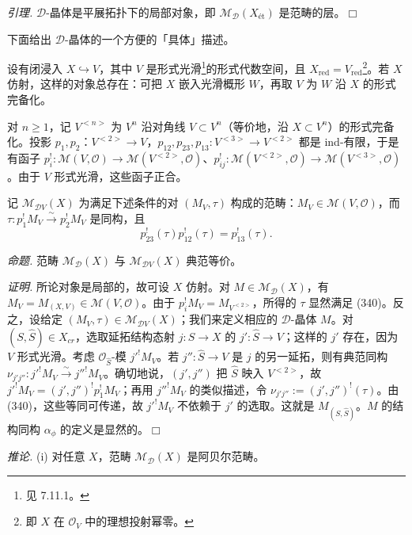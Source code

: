  \emph{引理.} $\mathcal{D}$-晶体是平展拓扑下的局部对象，即 $\mathcal{M}_{\mathcal{D}}(X_{\text{ét}})$ 是范畴的层。\hfill$\Box$

 下面给出 $\mathcal{D}$-晶体的一个方便的「具体」描述。

设有闭浸入 $X\hookrightarrow V$，其中 $V$ 是形式光滑\footnote{见 7.11.1。}的形式代数空间，且 $X_{\mathrm{red}}=V_{\mathrm{red}}$\footnote{即 $X$ 在 $\mathcal{O}_{V}$ 中的理想投射幂零。}。若 $X$ 仿射，这样的对象总存在：可把 $X$ 嵌入光滑概形 $W$，再取 $V$ 为 $W$ 沿 $X$ 的形式完备化。

对 $n\geq1$，记 $V^{<n>}$ 为 $V^{n}$ 沿对角线 $V\subset V^{n}$（等价地，沿 $X\subset V^{n}$）的形式完备化。投影 $p_{1},p_{2}$：$V^{<2>}\to V$，$p_{12},p_{23},p_{13}:V^{<3>}\to V^{<2>}$ 都是 ind-有限，于是有函子 $p^{!}_{i}:\mathcal{M}(V,\mathcal{O})\to\mathcal{M}(V^{<2>},\mathcal{O})$、$p^{!}_{ij}:\mathcal{M}(V^{<2>},\mathcal{O})\to\mathcal{M}(V^{<3>},\mathcal{O})$。由于 $V$ 形式光滑，这些函子正合。

记 $\mathcal{M}_{\mathcal{D}V}(X)$ 为满足下述条件的对 $(M_{V},\tau)$ 构成的范畴：$M_{V}\in\mathcal{M}(V,\mathcal{O})$，而 $\tau:p^{!}_{1}M_{V}\xrightarrow{\sim}p^{!}_{2}M_{V}$ 是同构，且
\begin{equation}\tag{340}
p^{!}_{23}(\tau)p^{!}_{12}(\tau)=p^{!}_{13}(\tau).
\end{equation}

 \emph{命题.} 范畴 $\mathcal{M}_{\mathcal{D}}(X)$ 与 $\mathcal{M}_{\mathcal{D}V}(X)$ 典范等价。

\emph{证明.} 所论对象是局部的，故可设 $X$ 仿射。对 $M\in\mathcal{M}_{\mathcal{D}}(X)$，有 $M_{V}=M_{(X,V)}\in\mathcal{M}(V,\mathcal{O})$。由于 $p^{!}_{i}M_{V}=M_{V^{<2>}}$，所得的 $\tau$ 显然满足 (340)。反之，设给定 $(M_{V},\tau)\in\mathcal{M}_{\mathcal{D}V}(X)$；我们来定义相应的 $\mathcal{D}$-晶体 $M$。对 $(S,\hat S)\in X_{cr}$，选取延拓结构态射 $j:S\to X$ 的 $j':\hat S\to V$；这样的 $j'$ 存在，因为 $V$ 形式光滑。考虑 $\mathcal{O}_{\hat S}$-模 $j'^{!}M_{V}$。若 $j'':\hat S\to V$ 是 $j$ 的另一延拓，则有典范同构 $\nu_{j'j''}:j'^{!}M_{V}\xrightarrow{\sim}j''^{!}M_{V}$。确切地说，$(j',j'')$ 把 $\hat S$ 映入 $V^{<2>}$，故 $j'^{!}M_{V}=(j',j'')^{!}p^{!}_{1}M_{V}$；再用 $j''^{!}M_{V}$ 的类似描述，令 $\nu_{j'j''}:=(j',j'')^{!}(\tau)$。由 (340)，这些等同可传递，故 $j'^{!}M_{V}$ 不依赖于 $j'$ 的选取。这就是 $M_{(S,\hat S)}$。$M$ 的结构同构 $\alpha_{\phi}$ 的定义是显然的。\hfill$\Box$

 \emph{推论.} (i) 对任意 $X$，范畴 $\mathcal{M}_{\mathcal{D}}(X)$ 是阿贝尔范畴。

